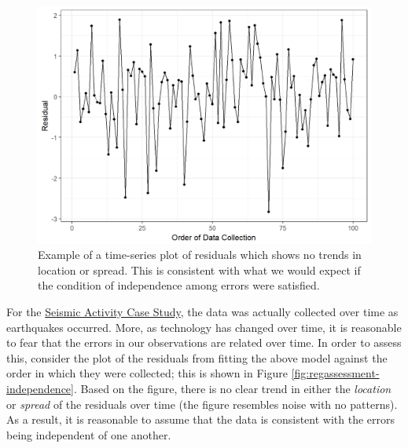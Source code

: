\documentclass[]{book}
\theoremstyle{plain}
\theoremstyle{mydefn}
\theoremstyle{myexmpl}
\theoremstyle{remark}
\begin{document}
\begin{figure}

{\centering \includegraphics[width=0.8\linewidth]{./Images/anovaassessment-independence-reasonable-1} 

}

\caption{Example of a time-series plot of residuals which shows no trends in location or spread.  This is consistent with what we would expect if the condition of independence among errors were satisfied.}\label{fig:anovaassessment-independence-reasonable}
\end{figure}

For the \protect\hyperlink{CaseGreece}{Seismic Activity Case Study}, the
data was actually collected over time as earthquakes occurred. More, as
technology has changed over time, it is reasonable to fear that the
errors in our observations are related over time. In order to assess
this, consider the plot of the residuals from fitting the above model
against the order in which they were collected; this is shown in Figure
\ref{fig:regassessment-independence}. Based on the figure, there is no
clear trend in either the \emph{location} or \emph{spread} of the
residuals over time (the figure resembles noise with no patterns). As a
result, it is reasonable to assume that the data is consistent with the
errors being independent of one another.
\end{document}
